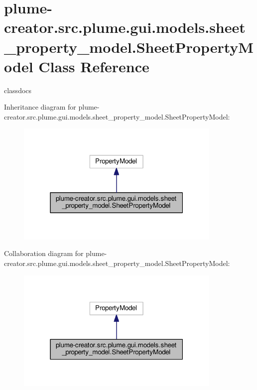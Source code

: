 \hypertarget{classplume-creator_1_1src_1_1plume_1_1gui_1_1models_1_1sheet__property__model_1_1_sheet_property_model}{}\section{plume-\/creator.src.\+plume.\+gui.\+models.\+sheet\+\_\+property\+\_\+model.\+Sheet\+Property\+Model Class Reference}
\label{classplume-creator_1_1src_1_1plume_1_1gui_1_1models_1_1sheet__property__model_1_1_sheet_property_model}


classdocs  




Inheritance diagram for plume-\/creator.src.\+plume.\+gui.\+models.\+sheet\+\_\+property\+\_\+model.\+Sheet\+Property\+Model\+:\nopagebreak
\begin{figure}[H]
\begin{center}
\leavevmode
\includegraphics[width=279pt]{classplume-creator_1_1src_1_1plume_1_1gui_1_1models_1_1sheet__property__model_1_1_sheet_property_model__inherit__graph}
\end{center}
\end{figure}


Collaboration diagram for plume-\/creator.src.\+plume.\+gui.\+models.\+sheet\+\_\+property\+\_\+model.\+Sheet\+Property\+Model\+:\nopagebreak
\begin{figure}[H]
\begin{center}
\leavevmode
\includegraphics[width=279pt]{classplume-creator_1_1src_1_1plume_1_1gui_1_1models_1_1sheet__property__model_1_1_sheet_property_model__coll__graph}
\end{center}
\end{figure}
